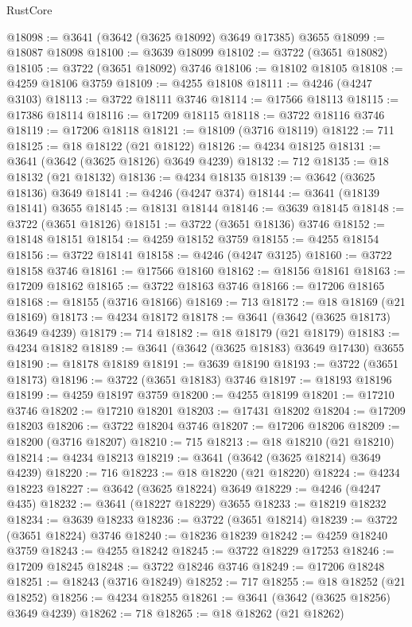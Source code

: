 \begin{lexlean}{RustCore}
\begin{coremodule}
@18098 := @3641 (@3642 (@3625 @18092) @3649 @17385) @3655
@18099 := @18087 @18098
@18100 := @3639 @18099
@18102 := @3722 (@3651 @18082)
@18105 := @3722 (@3651 @18092) @3746
@18106 := @18102 @18105
@18108 := @4259 @18106 @3759
@18109 := @4255 @18108
@18111 := @4246 (@4247 @3103)
@18113 := @3722 @18111 @3746
@18114 := @17566 @18113
@18115 := @17386 @18114
@18116 := @17209 @18115
@18118 := @3722 @18116 @3746
@18119 := @17206 @18118
@18121 := @18109 (@3716 @18119)
@18122 := 711
@18125 := @18 @18122 (@21 @18122)
@18126 := @4234 @18125
@18131 := @3641 (@3642 (@3625 @18126) @3649 @4239)
@18132 := 712
@18135 := @18 @18132 (@21 @18132)
@18136 := @4234 @18135
@18139 := @3642 (@3625 @18136) @3649
@18141 := @4246 (@4247 @374)
@18144 := @3641 (@18139 @18141) @3655
@18145 := @18131 @18144
@18146 := @3639 @18145
@18148 := @3722 (@3651 @18126)
@18151 := @3722 (@3651 @18136) @3746
@18152 := @18148 @18151
@18154 := @4259 @18152 @3759
@18155 := @4255 @18154
@18156 := @3722 @18141
@18158 := @4246 (@4247 @3125)
@18160 := @3722 @18158 @3746
@18161 := @17566 @18160
@18162 := @18156 @18161
@18163 := @17209 @18162
@18165 := @3722 @18163 @3746
@18166 := @17206 @18165
@18168 := @18155 (@3716 @18166)
@18169 := 713
@18172 := @18 @18169 (@21 @18169)
@18173 := @4234 @18172
@18178 := @3641 (@3642 (@3625 @18173) @3649 @4239)
@18179 := 714
@18182 := @18 @18179 (@21 @18179)
@18183 := @4234 @18182
@18189 := @3641 (@3642 (@3625 @18183) @3649 @17430) @3655
@18190 := @18178 @18189
@18191 := @3639 @18190
@18193 := @3722 (@3651 @18173)
@18196 := @3722 (@3651 @18183) @3746
@18197 := @18193 @18196
@18199 := @4259 @18197 @3759
@18200 := @4255 @18199
@18201 := @17210 @3746
@18202 := @17210 @18201
@18203 := @17431 @18202
@18204 := @17209 @18203
@18206 := @3722 @18204 @3746
@18207 := @17206 @18206
@18209 := @18200 (@3716 @18207)
@18210 := 715
@18213 := @18 @18210 (@21 @18210)
@18214 := @4234 @18213
@18219 := @3641 (@3642 (@3625 @18214) @3649 @4239)
@18220 := 716
@18223 := @18 @18220 (@21 @18220)
@18224 := @4234 @18223
@18227 := @3642 (@3625 @18224) @3649
@18229 := @4246 (@4247 @435)
@18232 := @3641 (@18227 @18229) @3655
@18233 := @18219 @18232
@18234 := @3639 @18233
@18236 := @3722 (@3651 @18214)
@18239 := @3722 (@3651 @18224) @3746
@18240 := @18236 @18239
@18242 := @4259 @18240 @3759
@18243 := @4255 @18242
@18245 := @3722 @18229 @17253
@18246 := @17209 @18245
@18248 := @3722 @18246 @3746
@18249 := @17206 @18248
@18251 := @18243 (@3716 @18249)
@18252 := 717
@18255 := @18 @18252 (@21 @18252)
@18256 := @4234 @18255
@18261 := @3641 (@3642 (@3625 @18256) @3649 @4239)
@18262 := 718
@18265 := @18 @18262 (@21 @18262)

\end{coremodule}
\end{lexlean}
